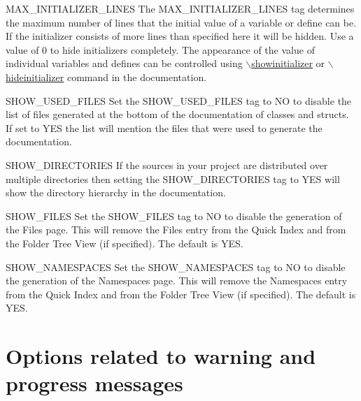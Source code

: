 \begin{DoxyDescription}
\label{config_cfg_max_initializer_lines}
\hypertarget{config_cfg_max_initializer_lines}{}
 
\item[{\ttfamily MAX\_\-INITIALIZER\_\-LINES} ] The {\ttfamily MAX\_\-INITIALIZER\_\-LINES} tag determines the maximum number of lines that the initial value of a variable or define can be. If the initializer consists of more lines than specified here it will be hidden. Use a value of 0 to hide initializers completely. The appearance of the value of individual variables and defines can be controlled using \hyperlink{commands_cmdshowinitializer}{$\backslash$showinitializer} or \hyperlink{commands_cmdhideinitializer}{$\backslash$hideinitializer} command in the documentation.

\label{config_cfg_show_used_files}
\hypertarget{config_cfg_show_used_files}{}
 
\item[{\ttfamily SHOW\_\-USED\_\-FILES} ] Set the {\ttfamily SHOW\_\-USED\_\-FILES} tag to {\ttfamily NO} to disable the list of files generated at the bottom of the documentation of classes and structs. If set to {\ttfamily YES} the list will mention the files that were used to generate the documentation.

\label{config_cfg_show_dirs}
\hypertarget{config_cfg_show_dirs}{}
 
\item[{\ttfamily SHOW\_\-DIRECTORIES} ] If the sources in your project are distributed over multiple directories then setting the SHOW\_\-DIRECTORIES tag to YES will show the directory hierarchy in the documentation.

\label{config_cfg_show_files}
\hypertarget{config_cfg_show_files}{}
 
\item[{\ttfamily SHOW\_\-FILES} ] Set the {\ttfamily SHOW\_\-FILES} tag to {\ttfamily NO} to disable the generation of the Files page. This will remove the Files entry from the Quick Index and from the Folder Tree View (if specified). The default is {\ttfamily YES}.

\label{config_cfg_show_namespaces}
\hypertarget{config_cfg_show_namespaces}{}
 
\item[{\ttfamily SHOW\_\-NAMESPACES} ] Set the {\ttfamily SHOW\_\-NAMESPACES} tag to {\ttfamily NO} to disable the generation of the Namespaces page. This will remove the Namespaces entry from the Quick Index and from the Folder Tree View (if specified). The default is {\ttfamily YES}.


\end{DoxyDescription}\hypertarget{config_messages_input}{}\section{Options related to warning and progress messages}\label{config_messages_input}
\label{config_cfg_quiet}
\hypertarget{config_cfg_quiet}{}
 
